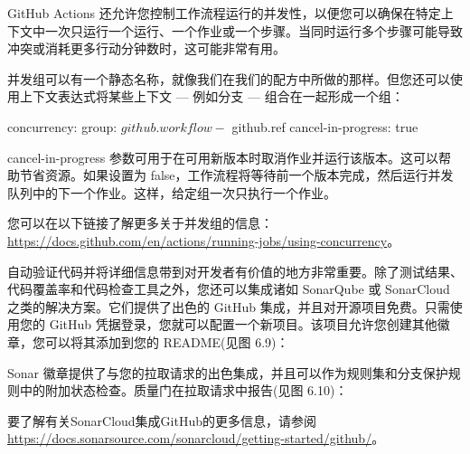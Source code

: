 GitHub Actions 还允许您控制工作流程运行的并发性，以便您可以确保在特定上下文中一次只运行一个运行、一个作业或一个步骤。当同时运行多个步骤可能导致冲突或消耗更多行动分钟数时，这可能非常有用。

并发组可以有一个静态名称，就像我们在我们的配方中所做的那样。但您还可以使用上下文表达式将某些上下文 --- 例如分支 --- 组合在一起形成一个组：

\begin{shell}
concurrency:
  group: ${{ github.workflow }}-${{ github.ref }}
  cancel-in-progress: true
\end{shell}

cancel-in-progress 参数可用于在可用新版本时取消作业并运行该版本。这可以帮助节省资源。如果设置为 false，工作流程将等待前一个版本完成，然后运行并发队列中的下一个作业。这样，给定组一次只执行一个作业。

您可以在以下链接了解更多关于并发组的信息：\url{https://docs.github.com/en/actions/running-jobs/using-concurrency}。


自动验证代码并将详细信息带到对开发者有价值的地方非常重要。除了测试结果、代码覆盖率和代码检查工具之外，您还可以集成诸如 SonarQube 或 SonarCloud 之类的解决方案。它们提供了出色的 GitHub 集成，并且对开源项目免费。只需使用您的 GitHub 凭据登录，您就可以配置一个新项目。该项目允许您创建其他徽章，您可以将其添加到您的 README(见图 6.9)：


Sonar 徽章提供了与您的拉取请求的出色集成，并且可以作为规则集和分支保护规则中的附加状态检查。质量门在拉取请求中报告(见图 6.10)：


要了解有关SonarCloud集成GitHub的更多信息，请参阅\url{https://docs.sonarsource.com/sonarcloud/getting-started/github/}。














